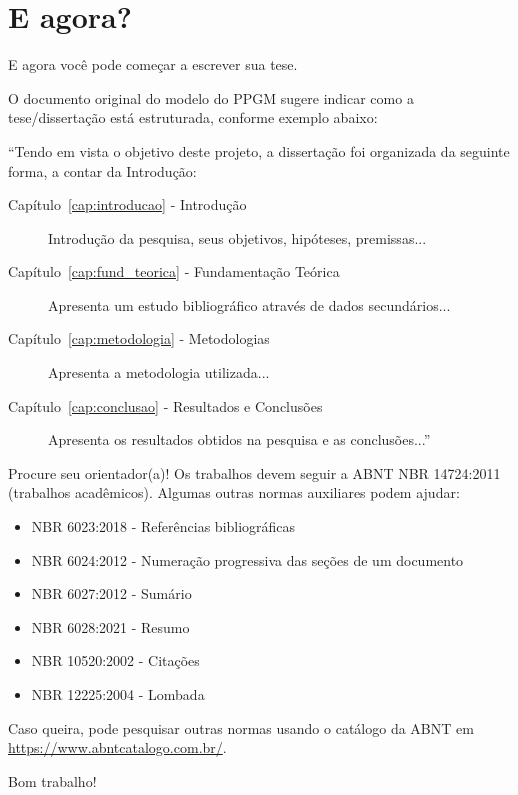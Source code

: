 \section{E agora?}
\label{sec:e_agora}

E agora você pode começar a escrever sua tese.

O documento original do modelo do PPGM sugere indicar como a tese/dissertação está estruturada, conforme exemplo abaixo:

``Tendo em vista o objetivo deste projeto, a dissertação foi organizada da seguinte forma, a contar da Introdução:

\begin{description}
    \item[Capítulo~\ref{cap:introducao} - Introdução] Introdução da pesquisa, seus objetivos, hipóteses, premissas...
    
    \item[Capítulo~\ref{cap:fund_teorica} - Fundamentação Teórica] Apresenta um estudo bibliográfico através de dados secundários...
    
    \item[Capítulo~\ref{cap:metodologia} - Metodologias] Apresenta a metodologia utilizada...
    
    \item[Capítulo~\ref{cap:conclusao} - Resultados e Conclusões] Apresenta os resultados obtidos na pesquisa e as conclusões...''
\end{description}

Procure seu orientador(a)! Os trabalhos devem seguir a ABNT NBR 14724:2011 (trabalhos acadêmicos). Algumas outras normas auxiliares podem ajudar:

\begin{itemize}
    \item NBR 6023:2018 - Referências bibliográficas
    \item NBR 6024:2012 - Numeração progressiva das seções de um documento
    \item NBR 6027:2012 - Sumário
    \item NBR 6028:2021 - Resumo
    \item NBR 10520:2002 - Citações
    \item NBR 12225:2004 - Lombada
\end{itemize}

Caso queira, pode pesquisar outras normas usando o catálogo da ABNT em \url{https://www.abntcatalogo.com.br/}.

Bom trabalho!
